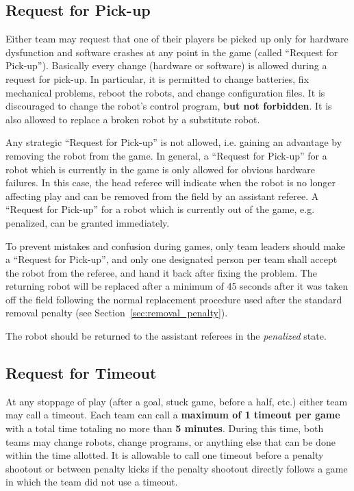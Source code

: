 \documentclass[12pt]{article}
\begin{document}
\subsection{Request for Pick-up}
\label{sec:request_for_pickup}

Either team may request that one of their players be picked up only for hardware dysfunction and software crashes at any point in the game (called ``Request for Pick-up''). 
Basically every change (hardware or software) is allowed during a request for pick-up. In particular,
it is permitted to change batteries, fix mechanical problems, reboot the robots, and change configuration files.
It is discouraged to change the robot's control program, \textbf{but not forbidden}.
It is also allowed to replace a broken robot by a substitute robot.

Any strategic ``Request for Pick-up'' is not allowed, i.e. gaining an advantage by removing the robot from the game.
In general, a ``Request for Pick-up'' for a robot which is currently in the game is only allowed for obvious hardware failures.
In this case, the head referee will indicate when the robot is no longer affecting play and can be removed from the field by an assistant referee.
A ``Request for Pick-up'' for a robot which is currently out of the game, e.g. penalized, can be granted immediately.

To prevent mistakes and confusion during games, only team leaders should make a ``Request for Pick-up'', and only one designated person per team shall accept the robot from the referee, and hand it back after fixing the problem.
The returning robot will be replaced after a minimum of 45 seconds after it was taken off the field following the normal replacement procedure used after the standard removal penalty (see Section~\ref{sec:removal_penalty}).

The robot should be returned to the assistant referees in the \emph{penalized} state.

\subsection{Request for Timeout}
\label{sec:request_for_timeout}

At any stoppage of play (after a goal, stuck game, before a half, etc.) either team may call a timeout. Each team can call a \textbf{maximum of 1 timeout per game} with a total time totaling no more than \textbf{5 minutes}. During this time, both teams may change robots, change programs, or anything else that can be done within the time allotted.  It is allowable to call one timeout before a penalty shootout or between penalty kicks if the penalty shootout directly follows a game in which the team did not use a timeout.
\end{document}
